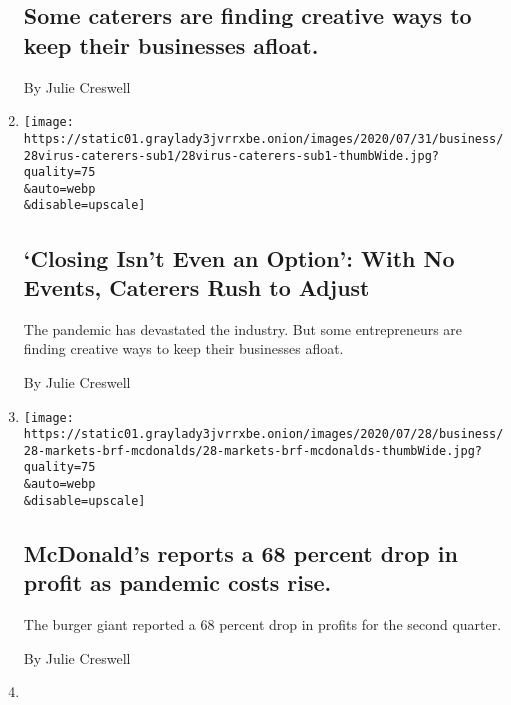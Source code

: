 \begin{enumerate}
{  \subsection{Some caterers are finding creative ways to keep their
  businesses
  afloat.}\label{some-caterers-are-finding-creative-ways-to-keep-their-businesses-afloat}}

  By Julie Creswell
\item
  \href{/2020/08/04/business/coronavirus-struggling-caterers.html}{}

  \texttt{[image: https://static01.graylady3jvrrxbe.onion/images/2020/07/31/business/28virus-caterers-sub1/28virus-caterers-sub1-thumbWide.jpg?quality=75\\\&auto=webp\\\&disable=upscale]}

  \hypertarget{closing-isnt-even-an-option-with-no-events-caterers-rush-to-adjust}{%
  \subsection{`Closing Isn't Even an Option': With No Events, Caterers
  Rush to
  Adjust}\label{closing-isnt-even-an-option-with-no-events-caterers-rush-to-adjust}}

  The pandemic has devastated the industry. But some entrepreneurs are
  finding creative ways to keep their businesses afloat.

  By Julie Creswell
\item
  \href{/live/2020/07/28/business/stock-market-today-coronavirus/mcdonalds-reports-a-68-percent-drop-in-profit-as-pandemic-costs-rise}{}

  \texttt{[image: https://static01.graylady3jvrrxbe.onion/images/2020/07/28/business/28-markets-brf-mcdonalds/28-markets-brf-mcdonalds-thumbWide.jpg?quality=75\\\&auto=webp\\\&disable=upscale]}

  \hypertarget{mcdonalds-reports-a-68-percent-drop-in-profit-as-pandemic-costs-rise}{%
  \subsection{McDonald's reports a 68 percent drop in profit as pandemic
  costs
  rise.}\label{mcdonalds-reports-a-68-percent-drop-in-profit-as-pandemic-costs-rise}}

  The burger giant reported a 68 percent drop in profits for the second
  quarter.

  By Julie Creswell
\item
  \href{/live/2020/07/21/business/stock-market-today-coronavirus/cokes-revenue-plummeted-28-in-the-second-quarter}{}


\end{enumerate}
